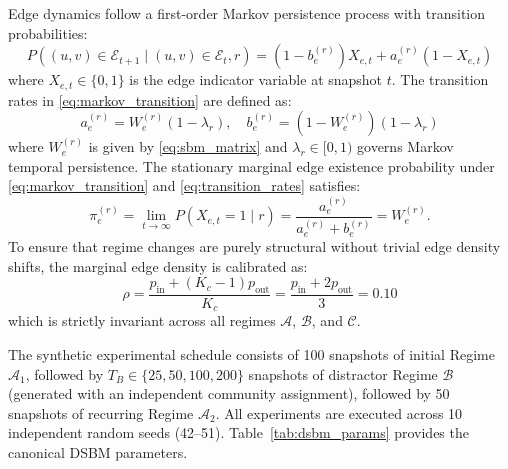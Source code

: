 \documentclass[conference]{IEEEtran}
\begin{document}
Edge dynamics follow a first-order Markov persistence process with transition probabilities:
\begin{equation}
\label{eq:markov_transition}
P\left((u, v) \in \mathcal{E}_{t+1} \mid (u, v) \in \mathcal{E}_t, r\right) = (1 - b_e^{(r)}) X_{e,t} + a_e^{(r)} (1 - X_{e,t})
\end{equation}
where $X_{e,t} \in \{0, 1\}$ is the edge indicator variable at snapshot $t$. The transition rates in \eqref{eq:markov_transition} are defined as:
\begin{equation}
\label{eq:transition_rates}
a_e^{(r)} = W_e^{(r)} (1 - \lambda_r), \quad b_e^{(r)} = (1 - W_e^{(r)}) (1 - \lambda_r)
\end{equation}
where $W_e^{(r)}$ is given by \eqref{eq:sbm_matrix} and $\lambda_r \in [0, 1)$ governs Markov temporal persistence. The stationary marginal edge existence probability under \eqref{eq:markov_transition} and \eqref{eq:transition_rates} satisfies:
\begin{equation}
\label{eq:stationary_distribution}
\pi_e^{(r)} = \lim_{t \to \infty} P(X_{e,t} = 1 \mid r) = \frac{a_e^{(r)}}{a_e^{(r)} + b_e^{(r)}} = W_e^{(r)}.
\end{equation}
To ensure that regime changes are purely structural without trivial edge density shifts, the marginal edge density is calibrated as:
\begin{equation}
\label{eq:density_invariance}
\rho = \frac{p_{\text{in}} + (K_c - 1) p_{\text{out}}}{K_c} = \frac{p_{\text{in}} + 2 p_{\text{out}}}{3} = 0.10
\end{equation}
which is strictly invariant across all regimes $\mathcal{A}$, $\mathcal{B}$, and $\mathcal{C}$.

The synthetic experimental schedule consists of 100 snapshots of initial Regime $\mathcal{A}_1$, followed by $T_B \in \{25, 50, 100, 200\}$ snapshots of distractor Regime $\mathcal{B}$ (generated with an independent community assignment), followed by 50 snapshots of recurring Regime $\mathcal{A}_2$. All experiments are executed across 10 independent random seeds (42--51). Table~\ref{tab:dsbm_params} provides the canonical DSBM parameters.
\end{document}

